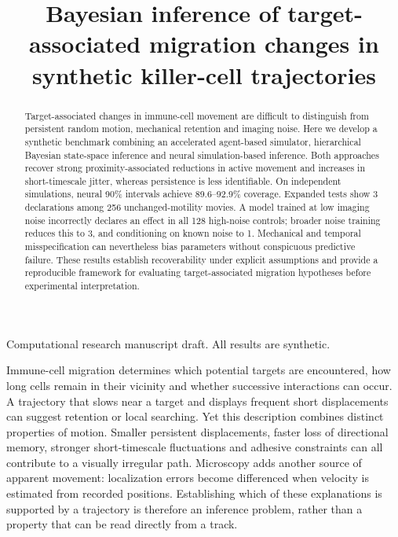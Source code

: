 \documentclass[12pt]{article}
\begin{document}
\title{Bayesian inference of target-associated migration changes in synthetic killer-cell trajectories}
\author{}
\date{}
\maketitle
\begin{center}\small Computational research manuscript draft. All results are synthetic.\end{center}
\begin{abstract}
Target-associated changes in immune-cell movement are difficult to distinguish from persistent random motion, mechanical retention and imaging noise. Here we develop a synthetic benchmark combining an accelerated agent-based simulator, hierarchical Bayesian state-space inference and neural simulation-based inference. Both approaches recover strong proximity-associated reductions in active movement and increases in short-timescale jitter, whereas persistence is less identifiable. On independent simulations, neural 90\% intervals achieve 89.6--92.9\% coverage. Expanded tests show 3 declarations among 256 unchanged-motility movies. A model trained at low imaging noise incorrectly declares an effect in all 128 high-noise controls; broader noise training reduces this to 3, and conditioning on known noise to 1. Mechanical and temporal misspecification can nevertheless bias parameters without conspicuous predictive failure. These results establish recoverability under explicit assumptions and provide a reproducible framework for evaluating target-associated migration hypotheses before experimental interpretation.
\end{abstract}
\clearpage
\linenumbers

Immune-cell migration determines which potential targets are encountered, how long cells remain in their vicinity and whether successive interactions can occur. A trajectory that slows near a target and displays frequent short displacements can suggest retention or local searching. Yet this description combines distinct properties of motion. Smaller persistent displacements, faster loss of directional memory, stronger short-timescale fluctuations and adhesive constraints can all contribute to a visually irregular path. Microscopy adds another source of apparent movement: localization errors become differenced when velocity is estimated from recorded positions. Establishing which of these explanations is supported by a trajectory is therefore an inference problem, rather than a property that can be read directly from a track.
\end{document}
